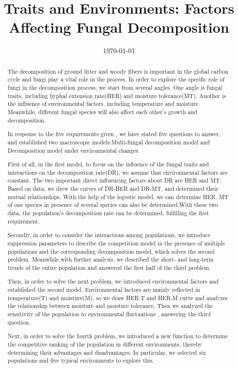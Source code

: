 \documentclass{mcmthesis}
\title{\large Traits and Environments: Factors Affecting Fungal Decomposition}
\author{ }
\date{\today}
\begin{document}
	
\begin{abstract}
	
The decomposition of ground litter and woody fibers is important in the global carbon cycle and fungi play a vital role in the process. In order to explore the specific role of fungi in the decomposition process, we start from several angles. One angle is  fungal traits, including hyphal extension rate(HER) and moisture tolerance(MT). Another is the influence of environmental factors, including temperature and moisture. Meanwhile, different fungal species will also affect each other’s growth and decomposition.

In response to the five requirements given , we have stated five questions to answer, and established two macroscopic models:Multi-fungal decomposition model and Decomposition model under environmental changes.

First of all, in the first model, to focus on the influence of the fungal traits and interactions on the decomposition rate(DR), we assume that environmental factors are constant. The two important direct influencing factors about DR are HER and MT. Based on data, we drew the curves of DR-HER and DR-MT, and determined their mutual relationships. With the help of the logestic model, we can determine HER. MT of one species in presence of several species can also be determined.With these two data, the population’s decomposition rate can be determined, fulfilling the first requirement.

Secondly, in order to consider the interactions among populations, we introduce suppression parameters to describe the competition model in the presence of multiple populations and the corresponding decomposition model, which solves the second problem. Meanwhile,with further analysis, we described the short- and long-term trends of the entire population and answered the first half of the third problem.

Then, in order to solve the next problem, we introduced environmental factors and established the second model. Environmental factors are mainly reflected in temperature(T) and moisture(M), so we draw HER-T and HER-M curve and analyzes the relationship between moisture and moisture tolerance. Then we analyzed the sensitivity of the population to environmental fluctuations , answering the third question.

Next, in order to solve the fourth problem, we introduced a new function to determine the competitive ranking of the population in different environments, thereby determining their advantages and disadvantages. In particular, we selected six populations and five typical environments to explore this.


\end{abstract}
\end{document}
